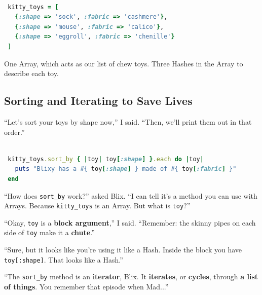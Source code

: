 \documentclass[10pt,twoside]{report}
\begin{document}
\begin{lstlisting}[basicstyle=\ttfamily\color{basiccolor},
    commentstyle = \ttfamily\color{commentcolor},
    keywordstyle=\ttfamily\color{keywordscolor},
    stringstyle=\color{stringcolor},
    language=Ruby,
    basicstyle=\small\ttfamily,
    showstringspaces=false,
  ]

 kitty_toys = [
   {:shape => 'sock', :fabric => 'cashmere'},
   {:shape => 'mouse', :fabric => 'calico'},
   {:shape => 'eggroll', :fabric => 'chenille'}
 ]

\end{lstlisting}


One Array, which acts as our list of chew toys.  Three Hashes in the
Array to describe each toy.



\subsection{Sorting and Iterating to Save Lives}



``Let's sort your toys by shape now,'' I said.  ``Then, we'll print
them out in that order.''


\begin{lstlisting}[basicstyle=\ttfamily\color{basiccolor},
    commentstyle = \ttfamily\color{commentcolor},
    keywordstyle=\ttfamily\color{keywordscolor},
    stringstyle=\color{stringcolor},
    language=Ruby,
    basicstyle=\small\ttfamily,
    showstringspaces=false,
  ]

 kitty_toys.sort_by { |toy| toy[:shape] }.each do |toy| 
   puts "Blixy has a #{ toy[:shape] } made of #{ toy[:fabric] }"
 end

\end{lstlisting}


``How does \lstinline[breaklines=true]|sort_by| work?'' asked Blix.
``I can tell it's a method you can use with Arrays.  Because
\lstinline[breaklines=true]|kitty_toys| is an Array.  But what is
\lstinline[breaklines=true]|toy|?''

``Okay, \lstinline[breaklines=true]|toy| is a {\bf block argument},''
I said.  ``Remember: the skinny pipes on each side of
\lstinline[breaklines=true]|toy| make it a {\bf chute}.''

``Sure, but it looks like you're using it like a Hash.  Inside the
block you have \lstinline[breaklines=true]|toy[:shape]|. That looks
like a Hash.''

``The \lstinline[breaklines=true]|sort_by| method is an {\bf
  iterator}, Blix.  It {\bf iterates}, or {\bf cycles}, through {\bf a
  list of things}.  You remember that episode when Mad...''
\end{document}
